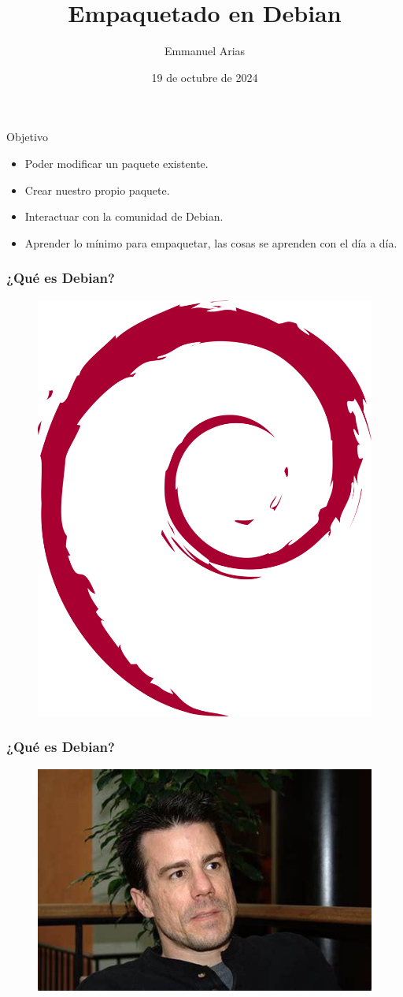 \documentclass{beamer}
\title{Empaquetado en Debian}
\author{Emmanuel Arias}
\date{19 de octubre de 2024}
\begin{document}
\begin{frame}[plain]
    \maketitle
\end{frame}
\begin{frame}{Objetivo}
  \begin{itemize}
    \item Poder modificar un paquete existente.
    \item Crear nuestro propio paquete.
    \item Interactuar con la comunidad de Debian.
    \item Aprender lo mínimo para empaquetar, las cosas se aprenden con el día a día.
  \end{itemize}
\end{frame}

\begin{frame}
  \frametitle{¿Qué es Debian?}
	\begin{figure}
		\centering
		\includegraphics[width=0.7\linewidth]{images/debian}
		\label{fig:debian}
	\end{figure}
\end{frame}

\begin{frame}
  \frametitle{¿Qué es Debian?}
	\begin{figure}
		\centering
		\includegraphics[width=0.7\linewidth]{images/ian.jpg}
		\label{fig:debian}
	\end{figure}
\end{frame}
\end{document}
